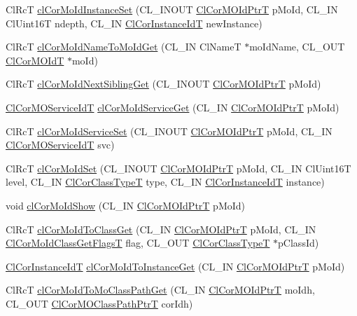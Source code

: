 \begin{CompactItemize}
\item 
Cl\-Rc\-T \hyperlink{group__group13_ga128}{cl\-Cor\-Mo\-Id\-Instance\-Set} (CL\_\-INOUT \hyperlink{struct_cl_cor_m_o_id}{Cl\-Cor\-MOId\-Ptr\-T} p\-Mo\-Id, CL\_\-IN Cl\-Uint16T ndepth, CL\_\-IN \hyperlink{group__group13_ga4}{Cl\-Cor\-Instance\-Id\-T} new\-Instance)
\item 
Cl\-Rc\-T \hyperlink{group__group13_ga116}{cl\-Cor\-Mo\-Id\-Name\-To\-Mo\-Id\-Get} (CL\_\-IN Cl\-Name\-T $\ast$mo\-Id\-Name, CL\_\-OUT \hyperlink{struct_cl_cor_m_o_id}{Cl\-Cor\-MOId\-T} $\ast$mo\-Id)
\item 
Cl\-Rc\-T \hyperlink{group__group13_ga119}{cl\-Cor\-Mo\-Id\-Next\-Sibling\-Get} (CL\_\-INOUT \hyperlink{struct_cl_cor_m_o_id}{Cl\-Cor\-MOId\-Ptr\-T} p\-Mo\-Id)
\item 
\hyperlink{group__group13_ga27}{Cl\-Cor\-MOService\-Id\-T} \hyperlink{group__group13_ga125}{cl\-Cor\-Mo\-Id\-Service\-Get} (CL\_\-IN \hyperlink{struct_cl_cor_m_o_id}{Cl\-Cor\-MOId\-Ptr\-T} p\-Mo\-Id)
\item 
Cl\-Rc\-T \hyperlink{group__group13_ga126}{cl\-Cor\-Mo\-Id\-Service\-Set} (CL\_\-INOUT \hyperlink{struct_cl_cor_m_o_id}{Cl\-Cor\-MOId\-Ptr\-T} p\-Mo\-Id, CL\_\-IN \hyperlink{group__group13_ga27}{Cl\-Cor\-MOService\-Id\-T} svc)
\item 
Cl\-Rc\-T \hyperlink{group__group13_ga111}{cl\-Cor\-Mo\-Id\-Set} (CL\_\-INOUT \hyperlink{struct_cl_cor_m_o_id}{Cl\-Cor\-MOId\-Ptr\-T} p\-Mo\-Id, CL\_\-IN Cl\-Uint16T level, CL\_\-IN \hyperlink{group__group13_ga2}{Cl\-Cor\-Class\-Type\-T} type, CL\_\-IN \hyperlink{group__group13_ga4}{Cl\-Cor\-Instance\-Id\-T} instance)
\item 
void \hyperlink{group__group13_ga114}{cl\-Cor\-Mo\-Id\-Show} (CL\_\-IN \hyperlink{struct_cl_cor_m_o_id}{Cl\-Cor\-MOId\-Ptr\-T} p\-Mo\-Id)
\item 
Cl\-Rc\-T \hyperlink{group__group13_ga115}{cl\-Cor\-Mo\-Id\-To\-Class\-Get} (CL\_\-IN \hyperlink{struct_cl_cor_m_o_id}{Cl\-Cor\-MOId\-Ptr\-T} p\-Mo\-Id, CL\_\-IN \hyperlink{group__group13_ga332}{Cl\-Cor\-Mo\-Id\-Class\-Get\-Flags\-T} flag, CL\_\-OUT \hyperlink{group__group13_ga2}{Cl\-Cor\-Class\-Type\-T} $\ast$p\-Class\-Id)
\item 
\hyperlink{group__group13_ga4}{Cl\-Cor\-Instance\-Id\-T} \hyperlink{group__group13_ga121}{cl\-Cor\-Mo\-Id\-To\-Instance\-Get} (CL\_\-IN \hyperlink{struct_cl_cor_m_o_id}{Cl\-Cor\-MOId\-Ptr\-T} p\-Mo\-Id)
\item 
Cl\-Rc\-T \hyperlink{group__group13_ga122}{cl\-Cor\-Mo\-Id\-To\-Mo\-Class\-Path\-Get} (CL\_\-IN \hyperlink{struct_cl_cor_m_o_id}{Cl\-Cor\-MOId\-Ptr\-T} mo\-Idh, CL\_\-OUT \hyperlink{struct_cl_cor_m_o_class_path}{Cl\-Cor\-MOClass\-Path\-Ptr\-T} cor\-Idh)

\end{CompactItemize}

